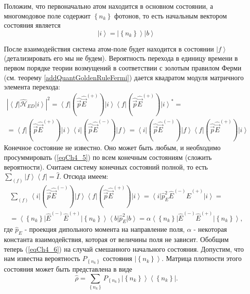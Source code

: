 Положим, что первоначально атом находится в основном состоянии, а
многомодовое поле содержит $\left\{n_k\right\}$ фотонов, то есть начальным
вектором состояния является 
\begin{equation}
\left|i\right> = \left|\left\{n_k\right\}\right> \left|b\right>
\label{eqCh4_4}
\end{equation}

После взаимодействия система атом-поле будет находится в состоянии
$\left|f\right>$ (детализировать его мы не будем). Вероятность
перехода в единицу времени в первом порядке теории возмущений в
соответствии с золотым правилом Ферми
(см. теорему \ref{addQuantGoldenRuleFermi}) дается 
квадратом модуля матричного элемента перехода: 
\begin{eqnarray}
\left|\left<f\right|\hat{\mathcal{H}}_{ED}\left|i\right>\right|^2 =
\left<f\right|\left(\hat{\vec{p}}\hat{\vec{E}}^{(+)}\right)\left|i\right>
\left<f\right|\left(\hat{\vec{p}}\hat{\vec{E}}^{(+)}\right)\left|i\right>^{*}
= 
\nonumber \\
=
\left<f\right|\left(\hat{\vec{p}}\hat{\vec{E}}^{(+)}\right)\left|i\right>
\left<i\right|\left(\hat{\vec{p}}\hat{\vec{E}}^{(-)}\right)\left|f\right>
=
\left<i\right|\left(\hat{\vec{p}}\hat{\vec{E}}^{(-)}\right)\left|f\right>
\left<f\right|\left(\hat{\vec{p}}\hat{\vec{E}}^{(+)}\right)\left|i\right>
\label{eqCh4_5}
\end{eqnarray}
Конечное состояние не известно. Оно может быть любым, и необходимо
просуммировать (\ref{eqCh4_5}) по всем конечным состояниям (сложить
вероятности). Считаем систему конечных состояний полной, то есть  
$\sum_{(f)} \left|f\right>\left<f\right| = \hat{I}$.
Отсюда имеем: 
\begin{eqnarray}
\sum_{(f)}
\left<i\right|\left(\hat{\vec{p}}\hat{\vec{E}}^{(-)}\right)\left|f\right>
\left<f\right|\left(\hat{\vec{p}}\hat{\vec{E}}^{(+)}\right)\left|i\right>
= 
\left<i\right|\hat{p}_E^2\hat{E}^{(-)}\hat{E}^{(+)}\left|i\right> = 
\nonumber \\
=
\left<\left\{n_k\right\}\right|\hat{E}^{(-)}\hat{E}^{(+)}\left|\left\{n_k\right\}\right>\left<b\right|\hat{p}_E^2\left|b\right>
= 
\alpha \left<\left\{n_k\right\}\right|\hat{E}^{(-)}\hat{E}^{(+)}\left|\left\{n_k\right\}\right>,
\label{eqCh4_6}
\end{eqnarray}
где $\hat{p}_E$ -  проекция дипольного момента на направление поля,
$\alpha$ - некоторая константа взаимодействия, которая от величины
поля не зависит. Обобщим теперь (\ref{eqCh4_6}) на случай смешанного
начального состояния. Допустим, что нам известна вероятность
$P_{\left\{n_k\right\}}$ состояния  $\left|\left\{n_k\right\}\right>$.
Матрица плотности этого состояния может быть представлена в виде 
\begin{equation}
\hat{\rho} = \sum_{\left\{n_k\right\}}P_{\left\{n_k\right\}}
\left|\left\{n_k\right\}\right>\left<\left\{n_k\right\}\right|.
\label{eqCh4_7}
\end{equation}

